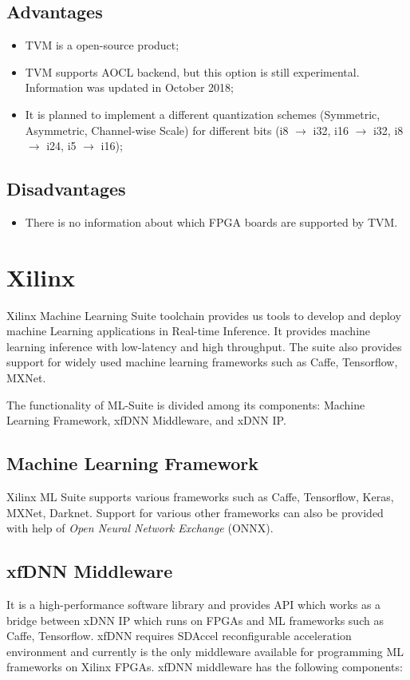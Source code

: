 \documentclass[titlepage]{report}
\begin{document}
\begin{itemize}
 \subsection{Advantages}
 \begin{itemize}
 \item TVM is a open-source product;
 \item TVM supports AOCL backend, but this option is still experimental. Information was updated in October 2018;
  \item It is planned to implement a different quantization schemes (Symmetric, Asymmetric, Channel-wise Scale) for different bits (i8 $\to$ i32, i16 $\to$ i32, i8 $\to$ i24, i5 $\to$ i16);
 \end{itemize}

 \subsection{Disadvantages}
 \begin{itemize}
 \item There is no information about which FPGA boards are supported by TVM.
 \end{itemize}

\section{Xilinx}
Xilinx Machine Learning Suite toolchain provides us tools to develop and deploy machine Learning applications in Real-time Inference. It provides machine learning inference with low-latency and high throughput. The suite also provides support for widely used machine learning frameworks such as Caffe, Tensorflow, MXNet.

The functionality of ML-Suite is divided among its components: Machine Learning Framework, xfDNN Middleware, and xDNN IP.

\subsection{Machine Learning Framework}
Xilinx ML Suite supports various frameworks such as Caffe, Tensorflow, Keras, MXNet, Darknet. Support for various other frameworks can also be provided with help of \textit{Open Neural Network Exchange} (ONNX).

\subsection{xfDNN Middleware}
It is a high-performance software library and provides API which works as a bridge between xDNN IP which runs on FPGAs and ML frameworks such as Caffe, Tensorflow. xfDNN requires SDAccel reconfigurable acceleration environment and currently is the only middleware available for programming ML frameworks on Xilinx FPGAs. xfDNN middleware has the following components:


\end{itemize}
\end{document}
